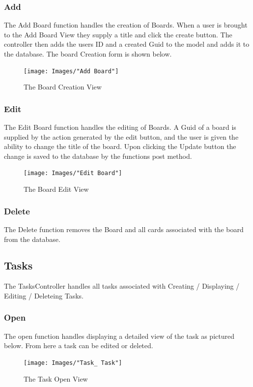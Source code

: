 \documentclass[letterpaper]{article}
\begin{document}
\subsubsection{Add}

The Add Board function handles the creation of Boards. When a user is brought to the Add Board View they supply a title and click the create button. The controller then adds the users ID and a created Guid to the model and adds it to the database. The board Creation form is shown below.

\begin{figure}[H]
  \centering
  \caption{The Board Creation View}
  \texttt{[image: Images/"Add Board"]}
\end{figure}


\subsubsection{Edit}

The Edit Board function handles the editing of Boards. A Guid of a board is supplied by the action generated by the edit button, and the user is given the ability to change the title of the board. Upon clicking the Update button the change is saved to the database by the functions post method.

\begin{figure}[H]
  \centering
  \caption{The Board Edit View}
  \texttt{[image: Images/"Edit Board"]}
\end{figure}

\subsubsection{Delete}
  The Delete function removes the Board and all cards associated with the board from the database.
\pagebreak

\subsection{Tasks}
The TasksController handles all tasks associated with Creating / Displaying / Editing / Deleteing Tasks.
\subsubsection{Open}
The open function handles displaying a detailed view of the task as pictured below. From here a task can be edited or deleted.

\begin{figure}[H]
  \centering
  \caption{The Task Open View}
  \texttt{[image: Images/"Task\_ Task"]}
\end{figure}
\end{document}
